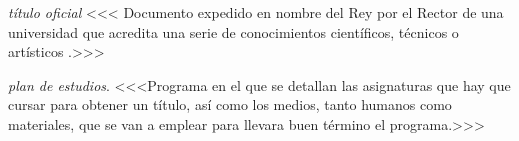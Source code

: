    \item \emph{título oficial} <<<\label{def_titulo_documento} Documento expedido en nombre del Rey por el Rector de una universidad \cite[artículo 35]{leyUniversidades} que acredita una serie de conocimientos científicos, técnicos o artísticos \cite[artículo 33]{leyUniversidades}.>>>

    \item \emph{plan de estudios}. <<<Programa en el que se detallan las asignaturas que hay que cursar para obtener un título, así como los medios, tanto humanos como materiales, que se van a emplear para llevara buen término el programa.>>>

